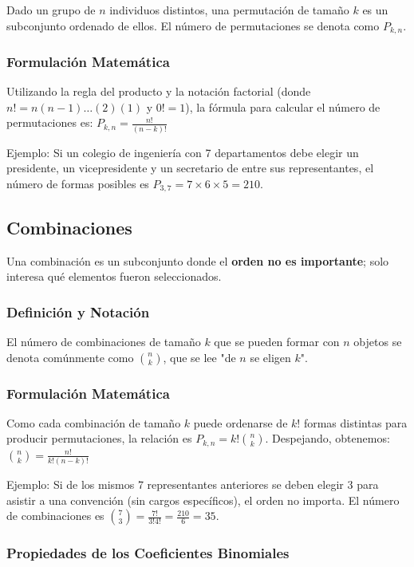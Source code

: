 \documentclass[a4paper]{article}
\begin{document}
Dado un grupo de $n$ individuos distintos, una permutación de tamaño $k$ es un subconjunto ordenado de ellos. El número de permutaciones se denota como $P_{k,n}$.

\subsubsection{Formulación Matemática}

Utilizando la regla del producto y la notación factorial (donde $n! = n(n-1)\dots(2)(1)$ y $0! = 1$), la fórmula para calcular el número de permutaciones es:
$P_{k,n} = \frac{n!}{(n-k)!}$

Ejemplo: Si un colegio de ingeniería con 7 departamentos debe elegir un presidente, un vicepresidente y un secretario de entre sus representantes, el número de formas posibles es $P_{3,7} = 7 \times 6 \times 5 = 210$.

\subsection{Combinaciones}

Una combinación es un subconjunto donde el \textbf{orden no es importante}; solo interesa qué elementos fueron seleccionados.

\subsubsection{Definición y Notación}

El número de combinaciones de tamaño $k$ que se pueden formar con $n$ objetos se denota comúnmente como $\binom{n}{k}$, que se lee "de $n$ se eligen $k$".

\subsubsection{Formulación Matemática}

Como cada combinación de tamaño $k$ puede ordenarse de $k!$ formas distintas para producir permutaciones, la relación es $P_{k,n} = k! \binom{n}{k}$. Despejando, obtenemos:
$\binom{n}{k} = \frac{n!}{k!(n-k)!}$

Ejemplo: Si de los mismos 7 representantes anteriores se deben elegir 3 para asistir a una convención (sin cargos específicos), el orden no importa. El número de combinaciones es $\binom{7}{3} = \frac{7!}{3!4!} = \frac{210}{6} = 35$.

\subsubsection{Propiedades de los Coeficientes Binomiales}
\end{document}
